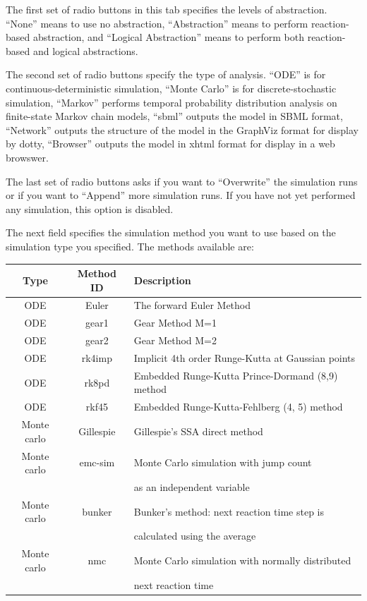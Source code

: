 \documentclass[titlepage,11pt]{article}
\begin{document}
The first set of radio buttons in this tab specifies the
levels of abstraction. ``None'' means to use no abstraction,
``Abstraction'' means to perform reaction-based abstraction, and
``Logical Abstraction'' means to perform both reaction-based and
logical abstractions.

The second set of radio buttons specify the type of analysis.
``ODE'' is for continuous-deterministic simulation,
``Monte Carlo'' is for discrete-stochastic simulation,
``Markov'' performs temporal probability distribution
analysis on finite-state Markov chain models, ``sbml''
outputs the model in SBML format, ``Network'' outputs the
structure of the model in the GraphViz format for display by dotty, 
``Browser'' outputs the model in xhtml format for display
in a web browswer.

The last set of radio buttons asks if you want to ``Overwrite''
the simulation runs or if you want to ``Append'' more
simulation runs. 
If you have not yet performed any simulation, this option is disabled.

The next field specifies the simulation method you want to use
based on the simulation type you specified. The methods available
are:

\begin{center}
\begin{tabular}{|c|c|l|}
\hline
Type & Method ID & Description \\ \hline \hline
ODE  & Euler     & The forward Euler Method \\ \hline
ODE  & gear1     & Gear Method M=1 \\ \hline
ODE  & gear2     & Gear Method M=2 \\ \hline
ODE  & rk4imp    & Implicit 4th order Runge-Kutta at Gaussian points \\ \hline
ODE  & rk8pd     & Embedded Runge-Kutta Prince-Dormand (8,9) method \\ \hline
ODE  & rkf45     & Embedded Runge-Kutta-Fehlberg (4, 5) method \\ \hline
Monte carlo & Gillespie & Gillespie's SSA direct method \\ \hline
Monte carlo & emc-sim   & Monte Carlo simulation with jump count \\
~ & ~ & as an independent variable \\ \hline
Monte carlo & bunker    & Bunker's method: next reaction time step is \\
~ & ~ & calculated using the average \\ \hline
Monte carlo & nmc       & Monte Carlo simulation with normally distributed \\
~ & ~ & next reaction time \\ \hline
\end{tabular}
\end{center}
\end{document}
